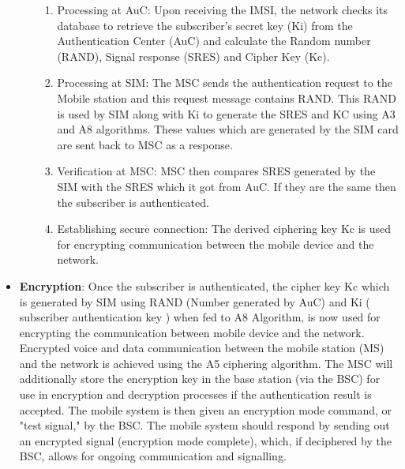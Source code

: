 \documentclass[conference]{IEEEtran}
\begin{document}
\begin{itemize}
\begin{itemize}
\begin{enumerate}
            \item Processing at AuC:
            Upon receiving the IMSI, the network checks its database to retrieve the subscriber's secret key (Ki) from the Authentication Center (AuC) and calculate the Random number (RAND), Signal response (SRES) and Cipher Key (Kc).

            \item Processing at SIM:
            The MSC sends the authentication request to the Mobile station and this request message contains RAND. This RAND is used by SIM along with Ki to generate the SRES and KC using A3 and A8 algorithms. These values which are generated by the SIM card are sent back to MSC as a response.

            \item Verification at MSC:
            MSC then compares SRES generated by the SIM with the SRES which it got from AuC. If they are the same then the subscriber is authenticated.

            \item Establishing secure connection:
            The derived ciphering key Kc is used for encrypting communication between the mobile device and the network. 
        \end{enumerate}
        
    \end{itemize}

    \item \textbf{Encryption}: 
    Once the subscriber is authenticated, the cipher key Kc which is generated by SIM using RAND (Number generated by AuC) and Ki ( subscriber authentication key ) when fed to A8 Algorithm, is now used for encrypting the communication between mobile device and the network.
    Encrypted voice and data communication between the mobile station (MS) and the network is achieved using the A5 ciphering algorithm. 
    The MSC will additionally store the encryption key in the base station (via the BSC) for use in encryption and decryption processes if the authentication result is accepted. The mobile system is then given an encryption mode command, or "test signal," by the BSC. 
    The mobile system should respond by sending out an encrypted signal (encryption mode complete), which, if deciphered by the BSC, allows for ongoing communication and signalling. \cite{margrave1999gsm}


\end{itemize}
\end{document}
